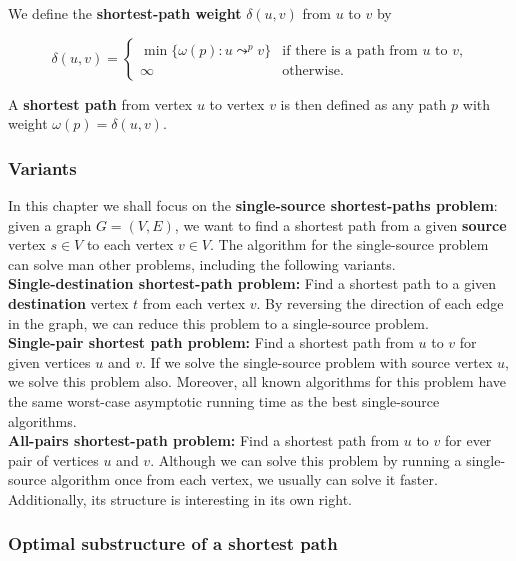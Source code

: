 \documentclass[12pt]{article}
\begin{document}
We define the \textbf{shortest-path weight} $\delta (u,v)$ from $u$ to $v$ by

\begin{equation*}
  \delta(u,v) =
  \begin{cases}
    \min \{ \omega(p) : u \leadsto^p v\} & \text{if there is  a path from $u$ to $v$,} \\
    \infty & \text{otherwise.}
  \end{cases}
\end{equation*}

A \textbf{shortest path} from vertex $u$ to vertex $v$ is then defined as any path $p$ with weight $\omega(p) = \delta(u,v)$.

\subsubsection*{Variants}

In this chapter we shall focus on the \textbf{single-source shortest-paths problem}: given a graph $G = (V,E)$, we want to find a shortest path from a given \textbf{source} vertex $s \in V$ to each vertex $v \in V$. The algorithm for the single-source problem can solve man other problems, including the following variants. \\

\textbf{Single-destination shortest-path problem:} Find a shortest path to a given \textbf{destination} vertex $t$ from each vertex $v$. By reversing the direction of each edge in the graph, we can reduce this problem to a single-source problem. \\

\textbf{Single-pair shortest path problem:} Find a shortest path from $u$ to $v$ for given vertices $u$ and $v$. If we solve the single-source problem with source vertex $u$, we solve this problem also. Moreover, all known algorithms for this problem have the same worst-case asymptotic running time as the best single-source algorithms. \\

\textbf{All-pairs shortest-path problem:} Find a shortest path from $u$ to $v$ for ever pair of vertices $u$ and $v$. Although we can solve this problem by running a single-source algorithm once from each vertex, we usually can solve it faster. Additionally, its structure is interesting in its own right.

\subsubsection*{Optimal substructure of a shortest path}
\end{document}
